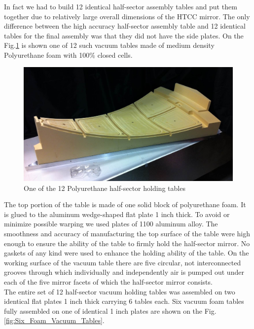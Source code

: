  \indent In fact we had to build 12 identical half-sector assembly tables and put them together due to relatively large overall dimensions of the HTCC mirror. The only difference between the high accuracy half-sector assembly table and 12 identical tables for the final assembly was that they did not have the side plates. On the Fig.\ref{fig:One_Foam_Vacuum_Table} is shown one of 12 such vacuum tables made of medium density Polyurethane foam with 100\% closed cells.
 
\begin{figure}[ht]
    \centering
    \includegraphics[width=1.0\linewidth]{images/One_Foam_Vacuum_Table.jpg}
    \caption{One of the 12 Polyurethane half-sector holding tables}
    \label{fig:One_Foam_Vacuum_Table}
\end{figure}
 
\indent The top portion of the table is made of one solid block of polyurethane foam. It is glued to the aluminum wedge-shaped flat plate 1 inch thick. To avoid or minimize possible warping we used plates of 1100 aluminum alloy. The smoothness and accuracy of manufacturing the top surface of the table were high enough to ensure the ability of the table to firmly hold the half-sector mirror. No gaskets of any kind were used to enhance the holding ability of the table. On the working surface of the vacuum table there are five circular, not interconnected grooves through which individually and independently air is pumped out under each of the five mirror facets of which the half-sector mirror consists.
\\
\indent The entire set of 12 half-sector vacuum holding tables was assembled on two identical flat plates 1 inch thick carrying 6 tables each. Six vacuum foam tables fully assembled on one of identical 1 inch plates are shown on the Fig.\ref{fig:Six_Foam_Vacuum_Tables}.
 
